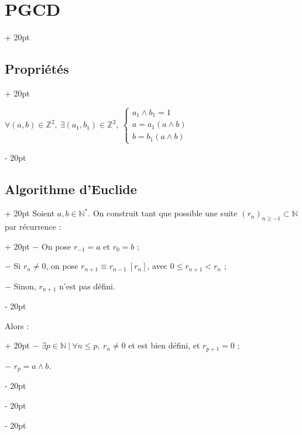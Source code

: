 \documentclass[a4paper, 12pt, twoside]{article}
\newcommand{\N}{\mathbb{N}} %
\newcommand{\Z}{\mathbb{Z}} %
\renewcommand{\le}{\leqslant}
\renewcommand{\ge}{\geqslant}
\newcommand{\ind}[1][20pt]{\advance\leftskip + #1}
\newcommand{\deind}[1][20pt]{\advance\leftskip - #1}
\newenvironment{indt}[2][20pt]{#2 \par \ind[#1]}{\par \deind} %
\begin{document}
\begin{indt}{\section{PGCD}}
\begin{indt}{\subsection{Propriétés}}
            \vspace{6pt}
            
            $
                \forall (a, b) \in \Z^2,\
                \exists (a_1, b_1) \in \Z^2,\
                \begin{cases}
                    a_1 \wedge b_1 = 1
                    \\
                    a = a_1(a \wedge b)
                    \\
                    b = b_1(a \wedge b)
                \end{cases}
            $
        \end{indt}
        
        \vspace{12pt}
        
        \begin{indt}{\subsection{Algorithme d'Euclide}}
            \begin{indt}{Soient $a, b \in \N^*$. On construit tant que possible une suite $(r_n)_{n \ge -1} \subset \N$ par récurrence :}
                $-$ On pose $r_{-1} = a$ et $r_0 = b$ ;
                
                $-$ Si $r_n \neq 0$, on pose $r_{n + 1} \equiv r_{n - 1}\ [r_n]$, avec $0 \le r_{n + 1} < r_n$ ;
                
                $-$ Sinon, $r_{n + 1}$ n'est pas défini.
            \end{indt}
            
            \vspace{12pt}
            
            \begin{indt}{Alors :}
                $-$ $\exists p \in \N\ |\ \forall n \le p,\ r_n \neq 0$ et est bien défini, et $r_{p + 1} = 0$ ;
                
                $-$ $r_p = a \wedge b$.
            \end{indt}
        \end{indt}
    \end{indt}
    
    \vspace{12pt}
    
\end{document}
